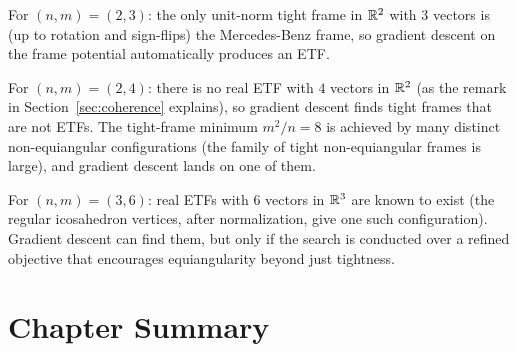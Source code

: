 \begin{examplebox}[title={Example 9.3: When gradient descent finds an ETF (and when it doesn't)}]
\label{ex:etf-gd}
For $(n,m)=(2,3)$: the only unit-norm tight frame in $\mathbb{R}^2$ with $3$
vectors is (up to rotation and sign-flips) the Mercedes-Benz frame, so
gradient descent on the frame potential automatically produces an ETF.

For $(n,m)=(2,4)$: there is no real ETF with $4$ vectors in $\mathbb{R}^2$ (as
the remark in Section~\ref{sec:coherence} explains), so gradient descent
finds tight frames that are not ETFs. The tight-frame minimum $m^2/n=8$
is achieved by many distinct non-equiangular configurations (the family
of tight non-equiangular frames is large), and gradient descent lands on
one of them.

For $(n,m)=(3,6)$: real ETFs with $6$ vectors in $\mathbb{R}^3$ are known to
exist (the regular icosahedron vertices, after normalization, give one
such configuration). Gradient descent can find them, but only if the
search is conducted over a refined objective that encourages
equiangularity beyond just tightness.
\end{examplebox}

\section{Chapter Summary}
\label{sec:summary-ch9}

